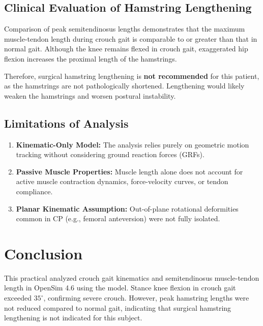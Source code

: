 \documentclass[12pt,a4paper]{article}
\newcommand{\csvfile}[1]{\texttt{\detokenize{#1}}}
\begin{document}
\subsection{Clinical Evaluation of Hamstring Lengthening}
Comparison of peak semitendinosus lengths demonstrates that the maximum muscle-tendon length during crouch gait is comparable to or greater than that in normal gait. Although the knee remains flexed in crouch gait, exaggerated hip flexion increases the proximal length of the hamstrings. 

Therefore, surgical hamstring lengthening is \textbf{not recommended} for this patient, as the hamstrings are not pathologically shortened. Lengthening would likely weaken the hamstrings and worsen postural instability.

\subsection{Limitations of Analysis}
\begin{enumerate}
    \item \textbf{Kinematic-Only Model:} The analysis relies purely on geometric motion tracking without considering ground reaction forces (GRFs).
    \item \textbf{Passive Muscle Properties:} Muscle length alone does not account for active muscle contraction dynamics, force-velocity curves, or tendon compliance.
    \item \textbf{Planar Kinematic Assumption:} Out-of-plane rotational deformities common in CP (e.g., femoral anteversion) were not fully isolated.
\end{enumerate}

\section{Conclusion}
This practical analyzed crouch gait kinematics and semitendinosus muscle-tendon length in OpenSim 4.6 using the \csvfile{gait2392.osim} model. Stance knee flexion in crouch gait exceeded $35^\circ$, confirming severe crouch. However, peak hamstring lengths were not reduced compared to normal gait, indicating that surgical hamstring lengthening is not indicated for this subject.
\end{document}
